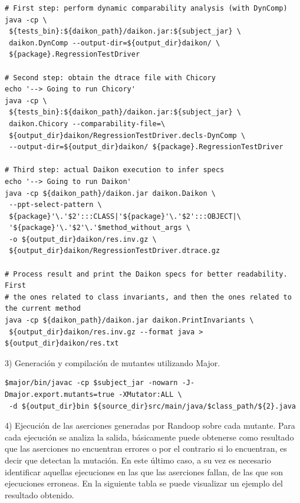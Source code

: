 \begin{lstlisting}[style=bashstyle, caption=Generación de tests con Randoop, label=lst:bashcode]
# First step: perform dynamic comparability analysis (with DynComp)
java -cp \
 ${tests_bin}:${daikon_path}/daikon.jar:${subject_jar} \
 daikon.DynComp --output-dir=${output_dir}daikon/ \
 ${package}.RegressionTestDriver

# Second step: obtain the dtrace file with Chicory
echo '--> Going to run Chicory'
java -cp \
 ${tests_bin}:${daikon_path}/daikon.jar:${subject_jar} \
 daikon.Chicory --comparability-file=\
 ${output_dir}daikon/RegressionTestDriver.decls-DynComp \
 --output-dir=${output_dir}daikon/ ${package}.RegressionTestDriver

# Third step: actual Daikon execution to infer specs
echo '--> Going to run Daikon'
java -cp ${daikon_path}/daikon.jar daikon.Daikon \
 --ppt-select-pattern \
 ${package}'\.'$2':::CLASS|'${package}'\.'$2':::OBJECT|\
 '${package}'\.'$2'\.'$method_without_args \
 -o ${output_dir}daikon/res.inv.gz \
 ${output_dir}daikon/RegressionTestDriver.dtrace.gz

# Process result and print the Daikon specs for better readability. First
# the ones related to class invariants, and then the ones related to the current method
java -cp ${daikon_path}/daikon.jar daikon.PrintInvariants \
 ${output_dir}daikon/res.inv.gz --format java > ${output_dir}daikon/res.txt
\end{lstlisting}


3) Generación y compilación de mutantes utilizando Major.

\begin{lstlisting}[style=bashstyle, caption=Generación de mutantes con Major, label=lst:bashcode]
$major/bin/javac -cp $subject_jar -nowarn -J-Dmajor.export.mutants=true -XMutator:ALL \
 -d ${output_dir}bin ${source_dir}src/main/java/$class_path/${2}.java
\end{lstlisting}


4) Ejecución de las aserciones generadas por Randoop sobre cada mutante.
Para cada ejecución se analiza la salida, básicamente puede obtenerse como resultado que las aserciones no encuentran errores o por el contrario si lo encuentran, es decir que detectan la mutación. En este último caso, a su vez es necesario identificar aquellas ejecuciones en las que las aserciones fallan, de las que son ejecuciones erroneas.
En la siguiente tabla se puede visualizar un ejemplo del resultado obtenido.

\vspace{10pt}

